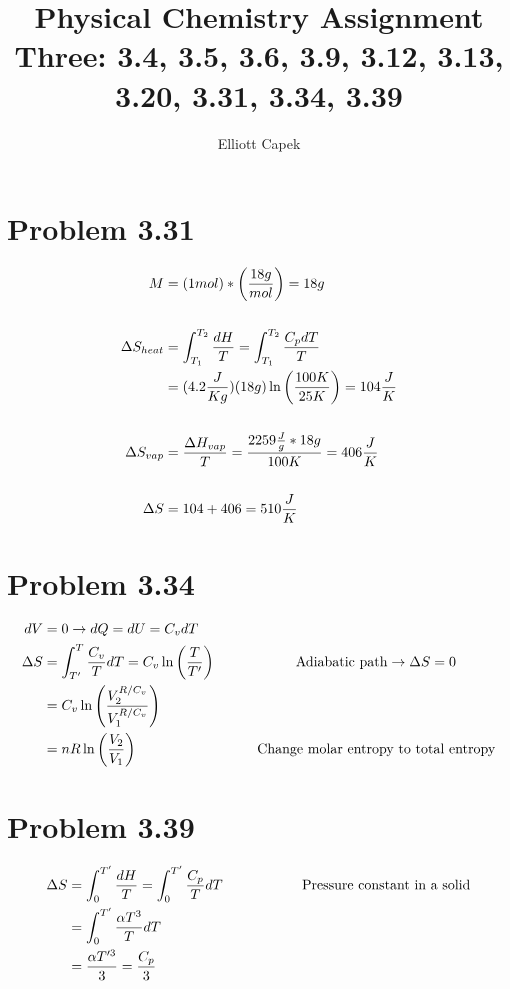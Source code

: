 \documentclass[10pt]{article} %
\title{Physical Chemistry Assignment Three: 3.4, 3.5, 3.6, 3.9, 3.12, 3.13, 3.20, 3.31, 3.34, 3.39}
\author{Elliott Capek}
\begin{document}
\maketitle{}

\section{Problem 3.31}
\begin{align*}
  M &= (1 mol) * \left(\frac{18g}{mol}\right) = 18g\\
  \vspace{1cm}\\
  \Delta S_{heat} &= \int_{T_1}^{T_2} \frac{dH}{T} = \int_{T_1}^{T_2} \frac{C_p dT}{T}\\
  &= (4.2\frac{J}{K g})(18g)\ln\left(\frac{100K}{25K}\right) = 104 \frac{J}{K}\\
  \vspace{1cm}\\
  \Delta S_{vap} &= \frac{\Delta H_{vap}}{T} = \frac{2259 \frac{J}{g} * 18g}{100K} = 406 \frac{J}{K}\\
  \vspace{1cm}\\
  \Delta S &= 104 + 406 = 510 \frac{J}{K}\\
\end{align*}

\section{Problem 3.34}
\begin{align*}
  dV &= 0 \rightarrow dQ = dU = C_v dT\\
  \Delta S &= \int_{T'}^T \frac{C_v}{T} dT = C_v\ln\left(\frac{T}{T'}\right)
  \hspace*{2cm} \mbox{Adiabatic path} \rightarrow \Delta S = 0\\
  &= C_v\ln\left(\frac{V_2^{R/C_v}}{V_1^{R/C_v}}\right)\\
  &= nR\ln\left(\frac{V_2}{V_1}\right)
  \hspace*{3cm}\mbox{Change molar entropy to total entropy}\\
\end{align*}

\section{Problem 3.39}
\begin{align*}
  \Delta S &= \int_0^{T'} \frac{dH}{T} = \int_0^{T'}\frac{C_p}{T}dT
  \hspace*{2cm} \mbox{Pressure constant in a solid}\\
  &= \int_0^{T'}\frac{\alpha T^3}{T}dT\\
  &= \frac{\alpha T'^3}{3} = \frac{C_p}{3}\\
\end{align*}
\end{document}
